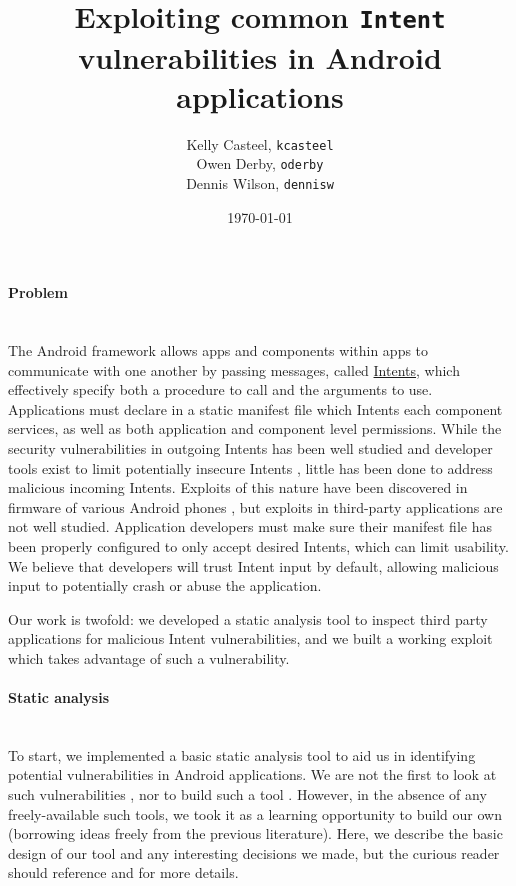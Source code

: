 \documentclass[12pt,a4paper]{article}
\title{Exploiting common \texttt{Intent} vulnerabilities in Android %
applications}
\date{\today}
\author{Kelly Casteel, \texttt{kcasteel}\\Owen Derby, \texttt{oderby}\\Dennis
 Wilson, \texttt{dennisw}}
\begin{document}
 

\maketitle

\paragraph{Problem} ~\\
The Android framework allows apps and components within apps to communicate with
one another by passing messages, called
\href{https://developer.android.com/reference/android/content/Intent.html}{Intents},
which effectively specify both a procedure to call and the arguments to use.
Applications must declare in a static manifest file which Intents each component
services, as well as both application and component level permissions. While the
security vulnerabilities in outgoing Intents has been well studied
\cite{chin_analyzing_2011} and developer tools exist to limit potentially
insecure Intents \cite{lu_chex_2012}, little has been done to address malicious
incoming Intents. Exploits of this nature have been discovered in firmware of
various Android phones \cite{grace_systematic_2012}, but exploits in third-party
applications are not well studied. Application developers must make sure their
manifest file has been properly configured to only accept desired Intents, which
can limit usability. We believe that developers will trust Intent input by
default, allowing malicious input to potentially crash or abuse the application.

Our work is twofold: we developed a static analysis tool to inspect third party
applications for malicious Intent vulnerabilities, and we built a working
exploit which takes advantage of such a vulnerability.

\paragraph{Static analysis} ~\\
To start, we implemented a basic static analysis tool to aid us in identifying
potential vulnerabilities in Android applications. We are not the first to look
at such vulnerabilities \cite{chin_analyzing_2011}, nor to build such a tool
\cite{grace_systematic_2012}. However, in the absence of any freely-available
such tools, we took it as a learning opportunity to build our own (borrowing
ideas freely from the previous literature). Here, we describe the basic design
of our tool and any interesting decisions we made, but the curious reader should
reference \cite{chin_analyzing_2011} and \cite{grace_systematic_2012} for more
details.
\end{document}
